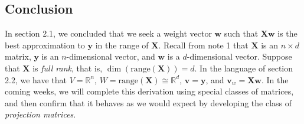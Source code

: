 \documentclass{article}
\newcommand{\R}{\mathbb{R}}
\newcommand{\tit}{\textit}
\begin{document}
\subsection{Conclusion}
In section 2.1, we concluded that we seek a weight vector $\mathbf{w}$ such that $\mathbf{Xw}$ is the best approximation to $\mathbf{y}$ in the range of $\mathbf{X}$. Recall from note 1 that $\mathbf{X}$ is an $n\times d$ matrix, $\mathbf{y}$ is an $n$-dimensional vector, and $\mathbf{w}$ is a $d$-dimensional vector. Suppose that $\mathbf{X}$ is \tit{full rank}, that is, $\dim(\text{range}(\mathbf{X})) = d$. In the language of section 2.2, we have that $V = \R^n$, $W = \text{range}(\mathbf{X}) \cong \R^d$, $\mathbf{v} = \mathbf{y}$, and $\mathbf{v}_w = \mathbf{Xw}$. In the coming weeks, we will complete this derivation using special classes of matrices, and then confirm that it behaves as we would expect by developing the class of \tit{projection matrices}.
\end{document}
